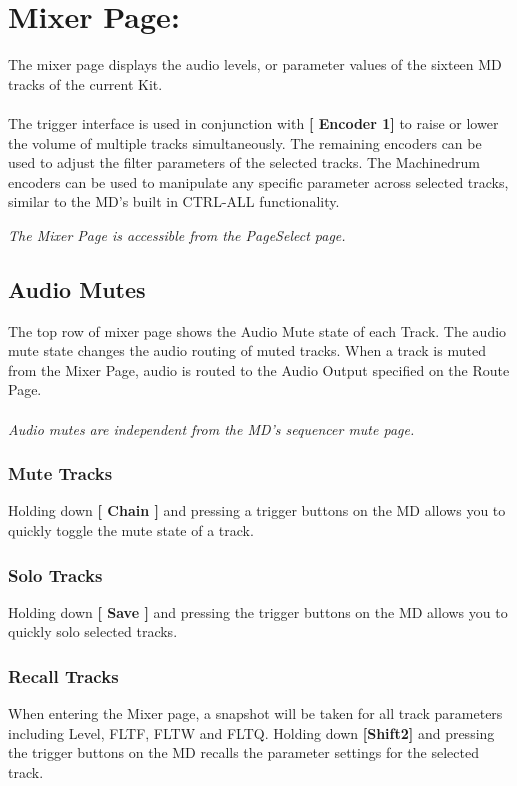 \chapter{Mixer Page:}
The mixer page displays the audio levels, or parameter values of the sixteen MD tracks of the current Kit.
\\\\
The trigger interface is used in conjunction with \textbf{[ Encoder 1]} to raise or lower the volume of multiple tracks simultaneously. The remaining encoders can be used to adjust the filter parameters of the selected tracks. The Machinedrum encoders can be used to manipulate any specific parameter across selected tracks, similar to the MD's built in CTRL-ALL functionality.


\textit{The Mixer Page is accessible from the PageSelect page.}


\section{Audio Mutes}

The top row of mixer page shows the Audio Mute state of each Track. The audio mute state changes the audio routing of muted tracks. When a track is muted from the Mixer Page, audio is routed to the Audio Output specified on the Route Page.\\
\\
\textit{Audio mutes are independent from the MD's sequencer mute page.}
\\
\subsection{Mute Tracks}
Holding down \textbf{[ Chain ]} and pressing a trigger buttons on the MD allows you to quickly toggle the mute state of a track.
\subsection{Solo Tracks}
Holding down \textbf{[ Save ]} and pressing the trigger buttons on the MD allows you to quickly solo selected tracks.
\subsection{Recall Tracks}
When entering the Mixer page, a snapshot will be taken for all track parameters including Level, FLTF, FLTW and FLTQ.
Holding down \textbf{[Shift2]} and pressing the trigger buttons on the MD recalls the parameter settings for the selected track.

